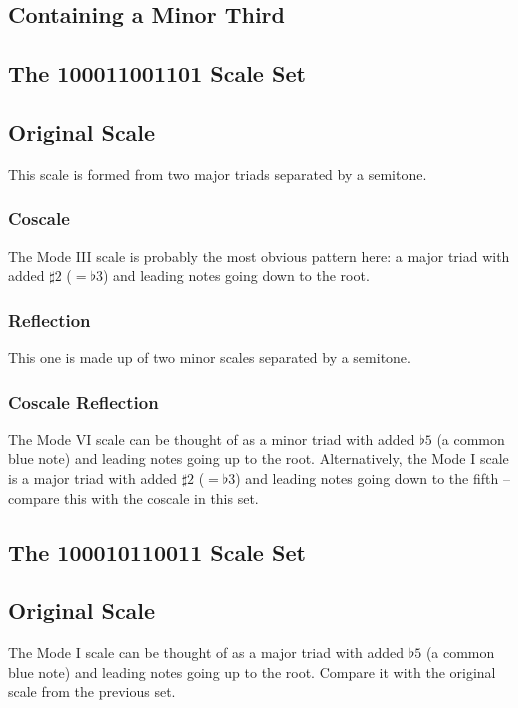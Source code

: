 \documentclass[english]{./gbook}
\begin{document}
\begin{large}
\section{Containing a Minor Third}

\subsection{The 100011001101 Scale Set}
\subsection*{Original Scale}
This scale is formed from two major triads separated by a semitone.
\subsubsection*{Coscale}
The Mode III scale is probably the most obvious pattern here: a major triad with added $\sharp2$ ($=\flat3$) and leading notes going down to the root.
\subsubsection*{Reflection}
This one is made up of two minor scales separated by a semitone.
\subsubsection*{Coscale Reflection}
The Mode VI scale can be thought of as a minor triad with added $\flat5$ (a common blue note) and leading notes going up to the root. Alternatively, the Mode I scale is a major triad with added $\sharp2$ ($=\flat3$) and leading notes going down to the fifth -- compare this with the coscale in this set.

\subsection{The 100010110011 Scale Set}
\subsection*{Original Scale}
The Mode I scale can be thought of as a major triad with added $\flat5$ (a common blue note) and leading notes going up to the root. Compare it with the original scale from the previous set. 

\end{large}
\end{document}
